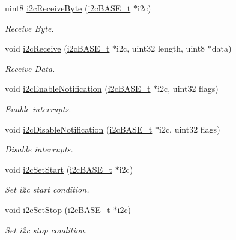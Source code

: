 \begin{DoxyCompactItemize}
uint8 \mbox{\hyperlink{group__I2C_gad48630f360b59984accf504f463e19ab}{i2c\+Receive\+Byte}} (\mbox{\hyperlink{reg__i2c_8h_a5d6c119fb20e803a530d0d4df544daf7}{i2c\+B\+A\+S\+E\+\_\+t}} $\ast$i2c)
\begin{DoxyCompactList}\small\item\em Receive Byte. \end{DoxyCompactList}\item 
void \mbox{\hyperlink{group__I2C_ga1df310e161fd03c20594f10437c3b66c}{i2c\+Receive}} (\mbox{\hyperlink{reg__i2c_8h_a5d6c119fb20e803a530d0d4df544daf7}{i2c\+B\+A\+S\+E\+\_\+t}} $\ast$i2c, uint32 length, uint8 $\ast$data)
\begin{DoxyCompactList}\small\item\em Receive Data. \end{DoxyCompactList}\item 
void \mbox{\hyperlink{group__I2C_ga24862ff10cfc010821e2295fb9930136}{i2c\+Enable\+Notification}} (\mbox{\hyperlink{reg__i2c_8h_a5d6c119fb20e803a530d0d4df544daf7}{i2c\+B\+A\+S\+E\+\_\+t}} $\ast$i2c, uint32 flags)
\begin{DoxyCompactList}\small\item\em Enable interrupts. \end{DoxyCompactList}\item 
void \mbox{\hyperlink{group__I2C_ga7be73e46b763d26e1de740449635006b}{i2c\+Disable\+Notification}} (\mbox{\hyperlink{reg__i2c_8h_a5d6c119fb20e803a530d0d4df544daf7}{i2c\+B\+A\+S\+E\+\_\+t}} $\ast$i2c, uint32 flags)
\begin{DoxyCompactList}\small\item\em Disable interrupts. \end{DoxyCompactList}\item 
void \mbox{\hyperlink{group__I2C_ga98e7d9411ca40a855eb3206cf3d875a3}{i2c\+Set\+Start}} (\mbox{\hyperlink{reg__i2c_8h_a5d6c119fb20e803a530d0d4df544daf7}{i2c\+B\+A\+S\+E\+\_\+t}} $\ast$i2c)
\begin{DoxyCompactList}\small\item\em Set i2c start condition. \end{DoxyCompactList}\item 
void \mbox{\hyperlink{group__I2C_ga65c7cf88cef1e3164da5fda0ecf77c78}{i2c\+Set\+Stop}} (\mbox{\hyperlink{reg__i2c_8h_a5d6c119fb20e803a530d0d4df544daf7}{i2c\+B\+A\+S\+E\+\_\+t}} $\ast$i2c)
\begin{DoxyCompactList}\small\item\em Set i2c stop condition. \end{DoxyCompactList}\item 

\end{DoxyCompactItemize}
